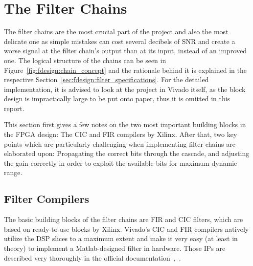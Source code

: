 \section{The Filter Chains} %
\label{sec:fpga:chains}
%
%
The filter chains are  the most crucial part of the project  and also the most
delicate one as simple mistakes can cost  several decibels of SNR and create a
worse  signal  at  the  filter  chain's output  than  at  its  input,  instead
of  an  improved  one.  The  logical  structure  of  the  chains can  be  seen
in  Figure~\ref{fig:fdesign:chain_concept}  and  the rationale  behind  it  is
explained  in the  respective Section~\ref{sec:fdesign:filter_specifications}.
For  the detailed  implementation, it  is advised  to look  at the  project in
Vivado  itself, as  the block  design is  impractically large  to be  put onto
paper, thus it is omitted in this report.

This section first gives a few notes on the two most important building blocks
in the FPGA design: The CIC and FIR  compilers by Xilinx.  After that, two key
points which are particularly challenging  when implementing filter chains are
elaborated  upon: Propagating  the  correct  bits  through  the  cascade,  and
adjusting  the gain  correctly  in order  to exploit  the  available bits  for
maximum dynamic range.

%
%
\subsection{Filter Compilers} %
\label{subsec:fpga:filter_compilers}

The  basic building  blocks of  the  filter chains  are FIR  and CIC  filters,
which  are  based on  ready-to-use  blocks  by  Xilinx. Vivado's CIC  and  FIR
compilers natively  utilize the  DSP slices  to a maximum  extent and  make it
very  easy  (at  least  in  theory)  to  implement  a  Matlab-designed  filter
in  hardware. Those  IPs  are  described   very  thoroughly  in  the  official
documentation~\cite{xilinx:fir-compiler},~\cite{xilinx:cic-compiler}.

